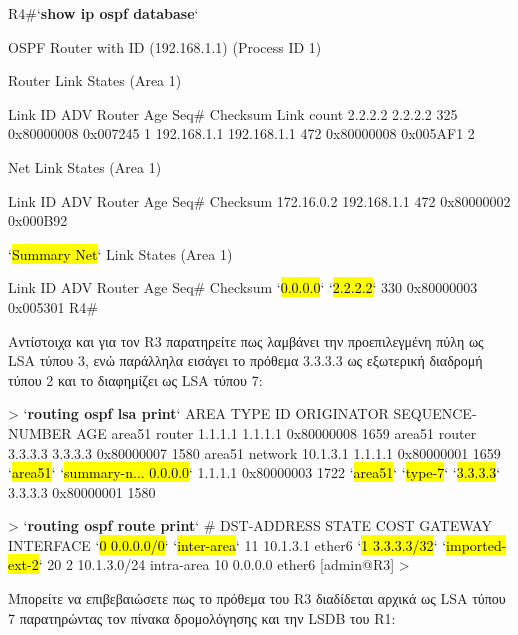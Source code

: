 \documentclass{EdipyLabs} %
\begin{document}
\begin{CommandBox}
R4#`\textbf{show ip ospf database}`

            OSPF Router with ID (192.168.1.1) (Process ID 1)

                Router Link States (Area 1)

Link ID         ADV Router      Age         Seq#       Checksum Link count
2.2.2.2         2.2.2.2         325         0x80000008 0x007245 1
192.168.1.1     192.168.1.1     472         0x80000008 0x005AF1 2

                Net Link States (Area 1)

Link ID         ADV Router      Age         Seq#       Checksum
172.16.0.2      192.168.1.1     472         0x80000002 0x000B92

                `\hl{Summary Net}` Link States (Area 1)

Link ID         ADV Router      Age         Seq#       Checksum
`\hl{0.0.0.0}`         `\hl{2.2.2.2}`         330         0x80000003 0x005301
R4#
\end{CommandBox}

Αντίστοιχα και για τον R3 παρατηρείτε πως λαμβάνει την προεπιλεγμένη πύλη ως LSA τύπου 3, ενώ παράλληλα εισάγει το πρόθεμα 3.3.3.3 ως εξωτερική διαδρομή τύπου 2 και το διαφημίζει ως LSA τύπου 7:

\begin{CommandBox}
[admin@R3] > `\textbf{routing ospf lsa print}`
AREA      TYPE         ID          ORIGINATOR   SEQUENCE-NUMBER      AGE
area51    router       1.1.1.1     1.1.1.1           0x80000008     1659
area51    router       3.3.3.3     3.3.3.3           0x80000007     1580
area51    network      10.1.3.1    1.1.1.1           0x80000001     1659
`\hl{area51}`    `\hl{summary-n... 0.0.0.0}`     1.1.1.1           0x80000003     1722
`\hl{area51}`    `\hl{type-7}`       `\hl{3.3.3.3}`     3.3.3.3           0x80000001     1580
\end{CommandBox}

\begin{CommandBox}
[admin@R3] > `\textbf{routing ospf route print}`
# DST-ADDRESS        STATE          COST       GATEWAY         INTERFACE
`\hl{0 0.0.0.0/0}`          `\hl{inter-area}`     11         10.1.3.1        ether6
`\hl{1 3.3.3.3/32}`         `\hl{imported-ext-2}` 20
2 10.1.3.0/24        intra-area     10         0.0.0.0         ether6
[admin@R3] >
\end{CommandBox}

Μπορείτε να επιβεβαιώσετε πως το πρόθεμα του R3 διαδίδεται αρχικά ως LSA τύπου 7 παρατηρώντας τον πίνακα δρομολόγησης και την LSDB του R1:
\end{document}
